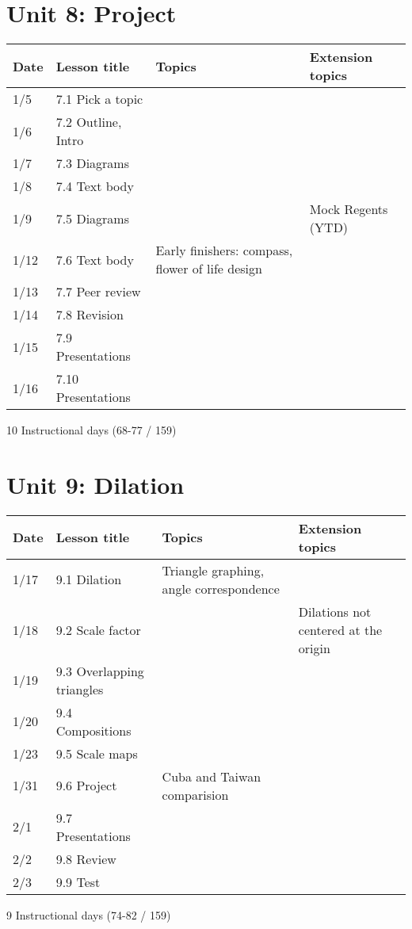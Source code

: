 \section*{Unit 8: Project}
\begin{tabular}{|p{0.9cm}|p{4cm}|p{7cm}|p{5cm}|}
  \hline
  Date & Lesson title & Topics  & Extension topics \\
  \hline
  1/5 & 7.1 Pick a topic &  &  \\
  \hline
  1/6 & 7.2 Outline, Intro &  &  \\
  \hline
  1/7 & 7.3 Diagrams &  &  \\
  \hline
  1/8 & 7.4 Text body &  &  \\
  \hline
  1/9 & 7.5 Diagrams &  & Mock Regents (YTD) \\
  \hline
  1/12 & 7.6 Text body & Early finishers: compass, flower of life design &  \\
  \hline
  1/13 & 7.7 Peer review &  &  \\
  \hline
  1/14 & 7.8 Revision &  & \\
  \hline
  1/15 & 7.9 Presentations &  &  \\
  \hline
  1/16 & 7.10 Presentations &  & \\
  \hline

\end{tabular} \par \vspace*{0.3cm}
10 Instructional days (68-77 / 159)

\newpage

\section*{Unit 9: Dilation}
\begin{tabular}{|p{0.9cm}|p{4cm}|p{7cm}|p{5cm}|}
  \hline
  Date & Lesson title & Topics  & Extension topics \\
  \hline
  1/17 & 9.1 Dilation & Triangle graphing, angle correspondence &  \\
  \hline
  1/18 & 9.2 Scale factor &  & Dilations not centered at the origin \\
  \hline
  1/19 & 9.3 Overlapping triangles &  &  \\
  \hline
  1/20 & 9.4 Compositions &  &  \\
  \hline
  1/23 & 9.5 Scale maps &  &  \\
  \hline
  1/31 & 9.6 Project & Cuba and Taiwan comparision & \\
  \hline
  2/1 & 9.7 Presentations &  &  \\
  \hline
  2/2 & 9.8 Review &  &  \\
  \hline
  2/3 & 9.9 Test &  &  \\
  \hline

\end{tabular} \par \vspace*{0.3cm}
9 Instructional days (74-82 / 159)


